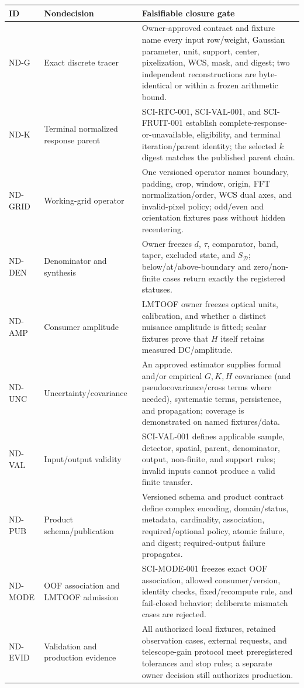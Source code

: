 \documentclass[11pt]{article}
\begin{document}
\begin{longtable}{@{}L{0.13\textwidth}L{0.34\textwidth}L{0.44\textwidth}@{}}
\toprule
ID & Nondecision & Falsifiable closure gate \\
\midrule
\endhead
ND-G & Exact discrete tracer & Owner-approved contract and fixture name every
input row/weight, Gaussian parameter, unit, support, center, pixelization,
WCS, mask, and digest; two independent reconstructions are byte-identical or
within a frozen arithmetic bound. \\
ND-K & Terminal normalized response parent & SCI-RTC-001, SCI-VAL-001, and
SCI-FRUIT-001 establish complete-response-or-unavailable, eligibility, and
terminal iteration/parent identity; the selected $k$ digest matches the
published parent chain. \\
ND-GRID & Working-grid operator & One versioned operator names boundary,
padding, crop, window, origin, FFT normalization/order, WCS dual axes, and
invalid-pixel policy; odd/even and orientation fixtures pass without hidden
recentering. \\
ND-DEN & Denominator and synthesis & Owner freezes $d$, $\tau$, comparator,
band, taper, excluded state, and $S_{\mathcal D}$; below/at/above-boundary and
zero/non-finite cases return exactly the registered statuses. \\
ND-AMP & Consumer amplitude & LMTOOF owner freezes optical units, calibration,
and whether a distinct nuisance amplitude is fitted; scalar fixtures prove
that $H$ itself retains measured DC/amplitude. \\
ND-UNC & Uncertainty/covariance & An approved estimator supplies formal and/or
empirical $G,K,H$ covariance (and pseudocovariance/cross terms where needed),
systematic terms, persistence, and propagation; coverage is demonstrated on
named fixtures/data. \\
ND-VAL & Input/output validity & SCI-VAL-001 defines applicable sample,
detector, spatial, parent, denominator, output, non-finite, and support rules;
invalid inputs cannot produce a valid finite transfer. \\
ND-PUB & Product schema/publication & Versioned schema and product contract
define complex encoding, domain/status, metadata, cardinality, association,
required/optional policy, atomic failure, and digest; required-output failure
propagates. \\
ND-MODE & OOF association and LMTOOF admission & SCI-MODE-001 freezes exact OOF
association, allowed consumer/version, identity checks, fixed/recompute rule,
and fail-closed behavior; deliberate mismatch cases are rejected. \\
ND-EVID & Validation and production evidence & All authorized local fixtures,
retained observation cases, external requests, and telescope-gain protocol
meet preregistered tolerances and stop rules; a separate owner decision still
authorizes production. \\
\bottomrule
\end{longtable}
\end{document}

